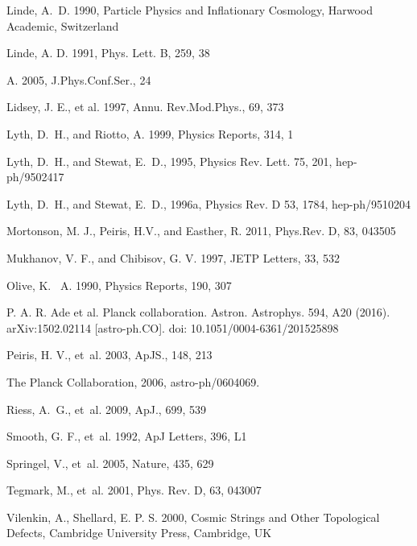 \documentclass{rmaa}
\begin{document}
\begin{thebibliography}
 Linde, A.~D. 1990, Particle Physics and Inflationary Cosmology, Harwood Academic,
Switzerland 

 Linde, A. D. 1991, Phys. Lett. B,  259, 38
 
 A. 2005, J.Phys.Conf.Ser., 24 
 
  Lidsey, J. E., et al. 1997, Annu. Rev.Mod.Phys., 69,  373  
 
Lyth, D.~H., and {Riotto,} A. 1999, Physics Reports, 314, 1

Lyth, D.~H., and {Stewat,} E.~D., 1995, Physics Rev. Lett. 75, 201, hep-ph/9502417

Lyth, D.~H., and {Stewat,} E.~D., 1996a, Physics Rev. D 53, 1784, hep-ph/9510204

Mortonson, M. J., Peiris, H.V., and Easther, R. 2011, Phys.Rev. D, 83, 043505 
  
 Mukhanov, V. F., and {Chibisov,} G. V. 1997, JETP Letters, 33, 532
  
 Olive, K. ~A. 1990, Physics Reports, 190, 307  

P.  A.  R.  Ade  et  al.  Planck  collaboration.  Astron.  Astrophys. 594, A20 (2016). arXiv:1502.02114 [astro-ph.CO]. doi: 10.1051/0004-6361/201525898

Peiris, H. V., et~al. 2003, ApJS., 148, 213  
 
The Planck Collaboration, 2006, astro-ph/0604069. 
 
 Riess, A.~G., et~al. 2009, ApJ., 699, 539 

Smooth, G. F., et~al. 1992, ApJ Letters, 396, L1 
  
 Springel, V., et~al.  2005, Nature, 435, 629  

Tegmark, M., et~al. 2001, Phys. Rev. D, 63, 043007   

 Vilenkin, A., Shellard, E. P. S. 2000, Cosmic Strings and Other Topological Defects,
Cambridge University Press,  Cambridge, UK 




\end{thebibliography}
\end{document}

